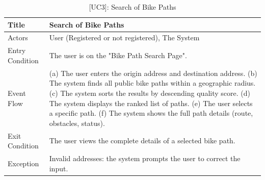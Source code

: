 \begin{table}[H]
    \centering
    \begin{tabular}{|p{4cm}|p{10cm}|}
        \hline
        Title & \textbf{Search of Bike Paths} \\
        \hline
        Actors & User (Registered or not registered), The System \\
        \hline
        Entry Condition & The user is on the "Bike Path Search Page". \\
        \hline
        Event Flow & 
        (a) The user enters the origin address and destination address. \newline
        (b) The system finds all public bike paths within a geographic radius. \newline
        (c) The system sorts the results by descending quality score. \newline
        (d) The system displays the ranked list of paths. \newline
        (e) The user selects a specific path. \newline
        (f) The system shows the full path details (route, obstacles, status). \\
        \hline
        Exit Condition & The user views the complete details of a selected bike path. \\
        \hline
        Exception & 
        Invalid addresses: the system prompts the user to correct the input. \\
        \hline
    \end{tabular}
    \caption{[UC3]: Search of Bike Paths}
    \label{tab:uc3}
\end{table}

